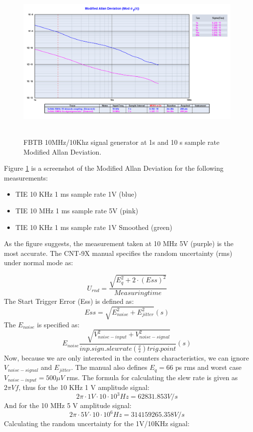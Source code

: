\documentclass[11pt,english,a4paper]{article}
\begin{document}
\begin{figure}[!htb]
  \centering
    \includegraphics[width=1\textwidth]{fbtb_10mhzkhz_generator_mod_allan.png}\
  \caption{FBTB 10MHz/10Khz signal generator at 1s and 10 s sample rate Modified Allan Deviation.}
      \label{fig:sg_10x_mod_allan_dev}
\end{figure}

Figure \ref{fig:sg_10x_mod_allan_dev} is a screenshot of the Modified Allan Deviation for the following measurements:
\begin{itemize}
  \item TIE 10 KHz 1 ms sample rate 1V (blue)
  \item TIE 10 MHz 1 ms sample rate 5V (pink)
  \item TIE 10 KHz 1 ms sample rate 1V Smoothed (green)
\end{itemize}
As the figure suggests, the measurement taken at 10 MHz 5V (purple) is the most accurate. The CNT-9X manual specifies the random uncertainty (rms) under normal mode as:

\begin{displaymath}
U_{rnd}=\frac{\sqrt{E_{q}^2 + 2\cdot(Ess)^2}}{Measuring time}
\end{displaymath}
The Start Trigger Error (Ess) is defined as:
\begin{displaymath}
Ess = \sqrt{ E_{noise}^2 + E_{jitter}^2 }(s)
\end{displaymath}
The $E_{noise}$ is specified as:
\begin{displaymath}
E_{noise}\frac{\sqrt[]{V_{noise-input}^2 + V_{noise-signal}^2}}{inp.sign.slew rate(\frac{v}{s}) trig. point}(s)
\end{displaymath}
Now, because we are only interested in the counters characteristics, we can ignore $V_{noise-signal}$ and $E_{jitter}$. The manual also defines $E_{q} = 66$ ps rms and worst case $V_{noise-input} = 500 \mu V$ rms. The formula for calculating the slew rate is given as $2\pi Vf$, thus for the 10 KHz 1 V amplitude signal:
\begin{displaymath}
2\pi\cdot1 V\cdot10\cdot10^3 Hz = 62831.853 V/s
\end{displaymath}
And for the 10 MHz 5 V amplitude signal:
\begin{displaymath}
2\pi\cdot5 V\cdot10\cdot10^6 Hz = 314159265.358 V/s
\end{displaymath}
\newline
Calculating the random uncertainty for the 1V/10KHz signal:
\end{document}
